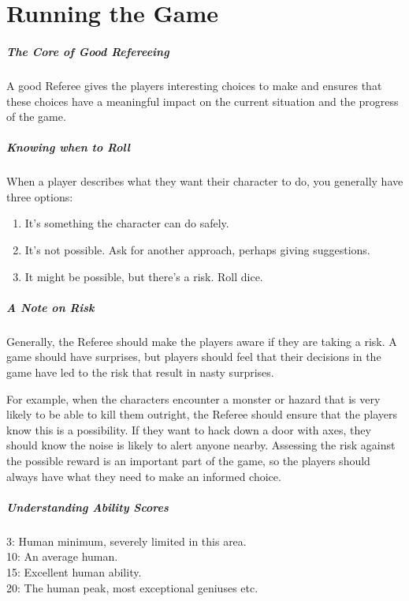 \documentclass[itdr]{subfiles}
\begin{document}

\chapter{Running the Game}
\label{ch:running_the_game}

\vspace{-0.85em}
\paragraph{The Core of Good Refereeing}
A good Referee gives the players interesting choices to make and ensures that these choices have a meaningful impact on the current situation and the progress of the game.

\paragraph{Knowing when to Roll}
When a player describes what they want their character to do, you generally
have three options:
\begin{enumerate}
	\item It's something the character can do safely.
	\item It's not possible. Ask for another approach, \mbox{perhaps} giving suggestions.
	\item It might be possible, but there's a risk. Roll dice.
\end{enumerate}

\paragraph{A Note on Risk}
Generally, the Referee should make the players aware if they are taking a risk. A game should have surprises, but players should feel that their decisions in the game have led to the risk that result in nasty surprises.

For example, when the characters encounter a monster or hazard that is very likely to be able to kill them outright, the Referee should ensure that the players know this is a possibility. If they want to hack down a door with axes, they should know the noise is likely to alert anyone nearby. Assessing the risk against the possible reward is an important part of the game, so the players should always have what they need to make an informed choice.

\paragraph{Understanding Ability Scores}
3: Human minimum, severely limited in this area.\\
10: An average human.\\
15: Excellent human ability.\\
20: The human peak, most exceptional geniuses etc.
\end{document}
